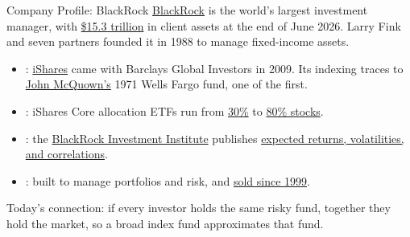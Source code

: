 \documentclass[aspectratio=169,11pt]{beamer}
\begin{document}
\begin{frame}{Company Profile: BlackRock}
\href{https://www.blackrock.com/corporate}{BlackRock} is the world's largest investment
manager, with \href{https://www.sec.gov/Archives/edgar/data/0002012383/000119312526304013/blk-ex99_1.htm}{\$15.3 trillion}
in client assets at the end of June 2026. Larry Fink and seven partners founded it in 1988 to manage
fixed-income assets.
\begin{itemize}\setlength{\itemsep}{0.3em}
\item {}: \href{https://www.ishares.com/us}{iShares} came with Barclays
Global Investors in 2009. Its indexing traces to
\href{https://www.dimensional.com/us-en/insights/remembering-john-mac-mcquown-whose-curiosity-drove-a-life-of-innovation}{John McQuown's}
1971 Wells Fargo fund, one of the first.
\item {}: iShares Core allocation ETFs run from
\href{https://www.ishares.com/us/products/239733/ishares-conservative-allocation-etf}{30\%}
to \href{https://www.ishares.com/us/products/239729/ishares-aggressive-allocation-etf}{80\% stocks}.
\item {}: the
\href{https://www.blackrock.com/corporate/insights/blackrock-investment-institute}{BlackRock Investment Institute}
publishes \href{https://www.blackrock.com/us/financial-professionals/insights/capital-market-assumptions}{expected returns, volatilities, and correlations}.
\item {}: built to manage portfolios and risk, and
\href{https://www.blackrock.com/aladdin/about-us/about/faqs}{sold since 1999}.
\end{itemize}
\vspace{0.2em}
Today's connection: if every investor holds the same risky fund, together they
hold the market, so a broad index fund approximates that fund.
\end{frame}
\end{document}
